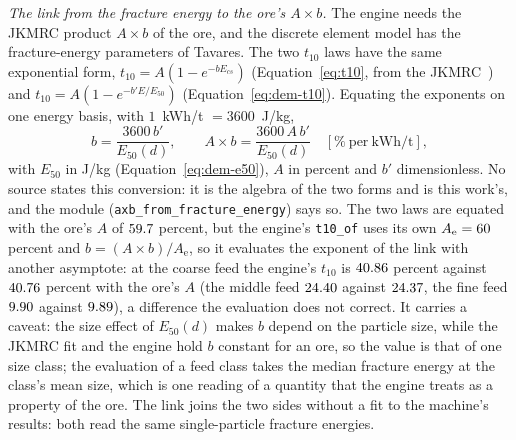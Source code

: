\emph{The link from the fracture energy to the ore's $A\times b$.} The engine needs the JKMRC product $A\times b$ of the ore, and the discrete element model has the fracture-energy parameters of Tavares. The two $t_{10}$ laws have the same exponential form, $t_{10}=A(1-e^{-bE_{cs}})$ (Equation~\eqref{eq:t10}, from the JKMRC~\cite{napier1996}) and $t_{10}=A\left(1-e^{-b'E/E_{50}}\right)$ (Equation~\eqref{eq:dem-t10}). Equating the exponents on one energy basis, with $1$~kWh/t $=3600$~J/kg,
\begin{equation}
b=\frac{3600\,b'}{E_{50}(d)},\qquad A\times b=\frac{3600\,A\,b'}{E_{50}(d)}\quad[\%\ \mathrm{per\ kWh/t}],
\label{eq:labjaw-axb}
\end{equation}
with $E_{50}$ in J/kg (Equation~\eqref{eq:dem-e50}), $A$ in percent and $b'$ dimensionless. No source states this conversion: it is the algebra of the two forms and is this work's, and the module (\texttt{axb\_from\_fracture\_energy}) says so. The two laws are equated with the ore's $A$ of $59.7$ percent, but the engine's \texttt{t10\_of} uses its own $A_{\mathrm e}=60$ percent and $b=(A\times b)/A_{\mathrm e}$, so it evaluates the exponent of the link with another asymptote: at the coarse feed the engine's $t_{10}$ is $40.86$ percent against $40.76$ percent with the ore's $A$ (the middle feed $24.40$ against $24.37$, the fine feed $9.90$ against $9.89$), a difference the evaluation does not correct. It carries a caveat: the size effect of $E_{50}(d)$ makes $b$ depend on the particle size, while the JKMRC fit and the engine hold $b$ constant for an ore, so the value is that of one size class; the
evaluation of a feed class takes the median fracture energy at the class's mean size, which is one reading of a quantity that the engine treats as a property of the ore. The link joins the two sides without a fit to the machine's results: both read the same single-particle fracture energies.

